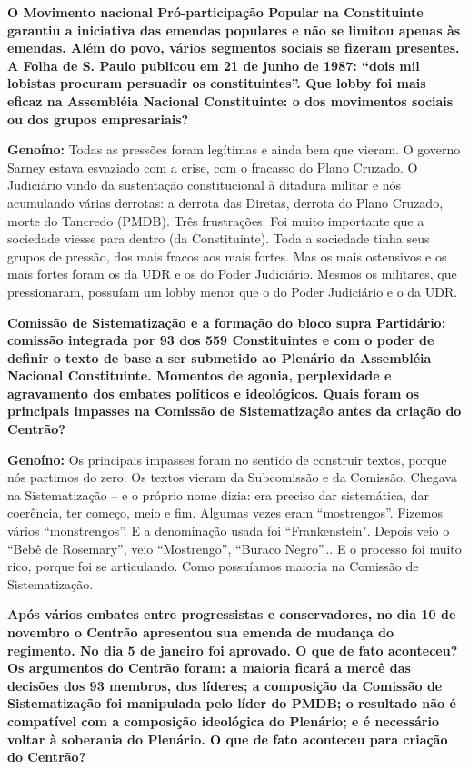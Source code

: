 \textbf{O Movimento nacional Pró-participação Popular na Constituinte
garantiu a iniciativa das emendas populares e não se limitou apenas às
emendas. Além do povo, vários segmentos sociais se fizeram presentes. A
Folha de S. Paulo publicou em 21 de junho de 1987: ``dois mil lobistas
procuram persuadir os constituintes''. Que lobby foi mais eficaz na
Assembléia Nacional Constituinte: o dos movimentos sociais ou dos grupos
empresariais?}

\textbf{Genoíno:} Todas as pressões foram legítimas e ainda bem que
vieram. O governo Sarney estava esvaziado com a crise, com o fracasso do
Plano Cruzado. O Judiciário vindo da sustentação constitucional à
ditadura militar e nós acumulando várias derrotas: a derrota das
Diretas, derrota do Plano Cruzado, morte do Tancredo (PMDB). Três
frustrações. Foi muito importante que a sociedade viesse para dentro (da
Constituinte). Toda a sociedade tinha seus grupos de pressão, dos mais
fracos aos mais fortes. Mas os mais ostensivos e os mais fortes foram os
da UDR e os do Poder Judiciário. Mesmos os militares, que pressionaram,
possuíam um lobby menor que o do Poder Judiciário e o da UDR.

\textbf{Comissão de Sistematização e a formação do bloco supra
Partidário: comissão integrada por 93 dos 559 Constituintes e com o
poder de definir o texto de base a ser submetido ao Plenário da
Assembléia Nacional Constituinte. Momentos de agonia, perplexidade e
agravamento dos embates políticos e ideológicos. Quais foram os
principais impasses na Comissão de Sistematização antes da criação do
Centrão?}

\textbf{Genoíno:} Os principais impasses foram no sentido de construir
textos, porque nós partimos do zero. Os textos vieram da Subcomissão e
da Comissão. Chegava na Sistematização -- e o próprio nome dizia: era
preciso dar sistemática, dar coerência, ter começo, meio e fim. Algumas
vezes eram ``mostrengos''. Fizemos vários ``monstrengos''. E a
denominação usada foi ``Frankenstein". Depois veio o ``Bebê de
Rosemary'', veio ``Mostrengo'', ``Buraco Negro''... E o processo foi
muito rico, porque foi se articulando. Como possuíamos maioria na
Comissão de Sistematização.

\textbf{Após vários embates entre progressistas e conservadores, no dia
10 de novembro o Centrão apresentou sua emenda de mudança do regimento.
No dia 5 de janeiro foi aprovado. O que de fato aconteceu? Os argumentos
do Centrão foram: a maioria ficará a mercê das decisões dos 93 membros,
dos líderes; a composição da Comissão de Sistematização foi manipulada
pelo líder do PMDB; o resultado não é compatível com a composição
ideológica do Plenário; e é necessário voltar à soberania do Plenário. O
que de fato aconteceu para criação do Centrão?}

